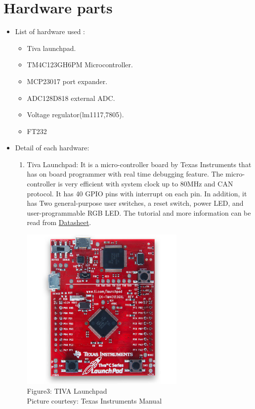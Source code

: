\documentclass[a4paper,12pt,oneside]{book}
\begin{document}
\section{Hardware parts}
\begin{itemize}
  \item List of hardware used :
  \begin{itemize}
  	\item Tiva launchpad. 
  	\item TM4C123GH6PM Microcontroller.
  	\item MCP23017 port expander.
  	\item ADC128D818 external ADC.
  	\item Voltage regulator(lm1117,7805).
  	\item FT232
  \end{itemize} 
  \item Detail of each hardware:
  \begin{enumerate}
  	\item Tiva Launchpad: It is a micro-controller  board by Texas Instruments that has on board programmer with real time debugging feature. The micro-controller is very efficient with system clock up to 80MHz and CAN protocol. It has 40 GPIO pins with interrupt on each pin. In addition, it has Two general-purpose user switches, a reset switch, power LED, and user-programmable RGB LED. The tutorial and more information can be read from \href{./datasheet/TIVALaunchpad.pdf}{Datasheet}.
  	\begin{center}
  		\includegraphics[width=8cm, height=8cm]{Images/launchpad}\\
  		Figure3: TIVA Launchpad\\
  		Picture courtesy: Texas Instruments Manual
  	\end{center}
   			

\end{enumerate}
\end{itemize}
\end{document}
